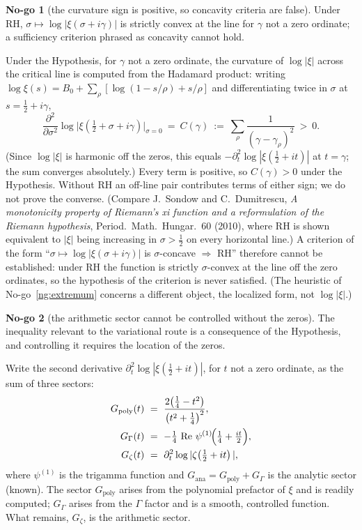 \documentclass[11pt]{amsart}
\theoremstyle{definition}
\theoremstyle{remark}
\theoremstyle{definition}
\newtheorem{nogo}{No-go}[section]
\renewcommand{\Re}{\operatorname{Re}}
\begin{document}
\begin{nogo}[the curvature sign is positive, so concavity criteria are false]\label{ng:curvature}
Under RH, $\sigma\mapsto\log|\xi(\sigma+i\gamma)|$ is strictly convex at the line for $\gamma$ not a zero
ordinate; a sufficiency criterion phrased as concavity cannot hold.
\end{nogo}
\noindent Under the Hypothesis, for $\gamma$ not a zero ordinate, the curvature of $\log|\xi|$ across the critical line is computed from the
Hadamard product: writing $\log\xi(s)=B_0+\sum_\rho[\log(1-s/\rho)+s/\rho]$ and differentiating twice in
$\sigma$ at $s=\tfrac12+i\gamma$,
\[
   \frac{\partial^2}{\partial\sigma^2}\log|\xi\!\left(\tfrac12+\sigma+i\gamma\right)\bigg|_{\sigma=0}
   \ =\ C(\gamma)\ :=\ \sum_\rho\frac{1}{(\gamma-\gamma_\rho)^2}\ >\ 0 .
\]
(Since $\log|\xi|$ is harmonic off the zeros, this equals $-\partial_t^2\log|\xi(\tfrac12+it)|$ at
$t=\gamma$; the sum converges absolutely.) Every term is positive, so $C(\gamma)>0$ under the Hypothesis.
Without RH an off-line pair contributes terms of either sign; we do not prove the converse. (Compare
J.~Sondow and C.~Dumitrescu, \emph{A monotonicity property of Riemann's xi function and a reformulation of
the Riemann hypothesis}, Period.\ Math.\ Hungar.\ 60 (2010), where RH is shown equivalent to $|\xi|$ being
increasing in $\sigma>\tfrac12$ on every horizontal line.) A criterion of the form
``$\sigma\mapsto\log|\xi(\sigma+i\gamma)|$ is $\sigma$-concave $\Rightarrow$ RH'' therefore cannot be
established: under RH the function is strictly $\sigma$-convex at the line off the zero ordinates, so the
hypothesis of the criterion is never satisfied. (The heuristic of No-go~\ref{ng:extremum} concerns a
different object, the localized form, not $\log|\xi|$.)

\begin{nogo}[the arithmetic sector cannot be controlled without the zeros]\label{ng:sector}
The inequality relevant to the variational route is a consequence of the Hypothesis, and controlling it
requires the location of the zeros.
\end{nogo}
\noindent Write the second derivative $\partial_t^2\log|\xi(\tfrac12+it)|$, for $t$ not a zero ordinate,
as the sum of three sectors:
\begin{align}
   G_{\mathrm{poly}}(t)&\ =\ \frac{2\bigl(\tfrac14-t^2\bigr)}{\bigl(t^2+\tfrac14\bigr)^2},\label{eq:gpoly}\\
   G_\Gamma(t)&\ =\ -\tfrac14\,\Re\,\psi^{(1)}\!\Bigl(\tfrac14+\tfrac{it}{2}\Bigr),\label{eq:ggamma}\\
   G_\zeta(t)&\ =\ \partial_t^2\log|\zeta\!\left(\tfrac12+it\right)|,\label{eq:gzeta}
\end{align}
where $\psi^{(1)}$ is the trigamma function and $G_{\mathrm{ana}}=G_{\mathrm{poly}}+G_\Gamma$ is the
analytic sector (known). The sector $G_{\mathrm{poly}}$ arises from the polynomial prefactor of $\xi$ and
is readily computed; $G_\Gamma$ arises from the $\Gamma$ factor and is a smooth, controlled function.
What remains, $G_\zeta$, is the arithmetic sector.
\end{document}
